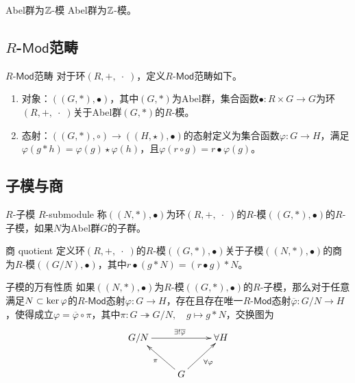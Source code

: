 \begin{proposition}{Abel群为$\mathbb{Z}$-模}
	Abel群为$\mathbb{Z}$-模。
\end{proposition}

\subsection{$R$-$\mathsf{Mod}$范畴}

\begin{definition}{$R$-$\mathsf{Mod}$范畴}
	对于环$(R,+,\;\cdot\;)$，定义$R$-$\mathsf{Mod}$范畴如下。
	\begin{enumerate}
		\item  对象：$((G,*),\bullet)$，其中$(G,*)$为Abel群，集合函数$\bullet:R\times G\to G$为环$(R,+,\;\cdot\;)$关于Abel群$(G,*)$的$R$-模。
		\item 态射：$((G,*),\circ)\to ((H,\star),\bullet)$的态射定义为集合函数$\varphi:G\to H$，满足$\varphi(g*h)=\varphi(g)\star \varphi(h)$，且$\varphi(r\circ g)=r\bullet\varphi(g)$。
	\end{enumerate}
\end{definition}

\subsection{子模与商}

\begin{definition}{$R$-子模 $R$-submodule}
	称$((N,*),\bullet)$为环$(R,+,\;\cdot\;)$的$R$-模$((G,*),\bullet)$的$R$-子模，如果$N$为Abel群$G$的子群。
\end{definition}

\begin{definition}{商 quotient}
	定义环$(R,+,\;\cdot\;)$的$R$-模$((G,*),\bullet)$关于子模$((N,*),\bullet)$的商为$R$-模$((G/N),\bullet)$，其中$r\bullet (g*N)=(r\bullet g)*N$。
\end{definition}

\begin{theorem}{子模的万有性质}
	如果$((N,*),\bullet)$为$R$-模$((G,*),\bullet)$的$R$-子模，那么对于任意满足$N\subset\ker\varphi$的$R$-$\mathsf{Mod}$态射$\varphi:G\to H$，存在且存在唯一$R$-$\mathsf{Mod}$态射$\overline{\varphi}:G/N\to H$，使得成立$\varphi=\overline{\varphi}\circ\pi$，其中$\pi:G\twoheadrightarrow G/N,\quad g\mapsto g*N$，交换图为
	$$
	\xymatrix{
		G/N \ar^{\exists!\overline{\varphi}}[rr]& &\forall H\\
		& G \ar[ul]^{\pi} \ar[ur]_{\forall\varphi} &
	}
	$$
\end{theorem}

